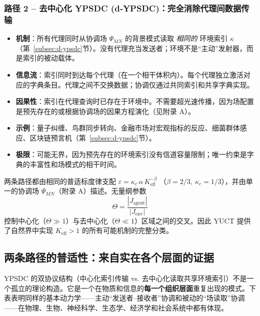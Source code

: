\documentclass[11pt,a4paper]{article}
\begin{document}
	\subsubsection*{路径 2 – 去中心化 YPSDC (d‑YPSDC)：完全消除代理间数据传输}
	\begin{itemize}[leftmargin=*]
		\item \textbf{机制}：所有代理同时从协调场 \(\Psi_{MN}\) 的背景模式读取 \emph{相同的} 环境索引 \(\kappa\)（第~\ref{subsec:d-ypsdc}节）。没有代理充当发送者；环境不是“主动”发射器，而是索引的被动载体。
		\item \textbf{信息流}：索引同时到达每个代理（在一个相干体积内）。每个代理独立激活对应的字典条目。代理之间不交换数据；协调仅通过共同索引和共享字典实现。
		\item \textbf{因果性}：索引在代理查询时已存在于环境中。不需要超光速传播，因为场配置是预先存在的或根据协调场的因果方程演化（见附录 A）。
		\item \textbf{示例}：量子纠缠、鸟群同步转向、金融市场对宏观指标的反应、细菌群体感应、区块链预言机（第~\ref{subsec:d-ypsdc}节）。
		\item \textbf{极限}：可能无界，因为预先存在的环境索引没有信道容量限制；唯一约束是字典的丰富性和场模式的相干时间。
	\end{itemize}
	
	\medskip
	\noindent
	两条路径都由相同的普适标度律支配
	\(\varepsilon = \kappa_c \, \alpha \, K_{\mathrm{eff}}^{-\beta}\)
	（\(\beta = 2/3,\ \kappa_c = 1/3\)），并由单一的协调场 \(\Psi_{MN}\)（附录 A）描述。无量纲参数
	\[
	\Theta = \frac{|J_{\mathrm{agent}}|}{|J_{\mathrm{env}}|}
	\]
	控制中心化（\(\Theta \gg 1\)）与去中心化（\(\Theta \ll 1\)）区域之间的交叉。因此 YUCT 提供了自然界中实现 \(K_{\mathrm{eff}} > 1\) 的所有可能机制的完整分类。
	
	\subsection{两条路径的普适性：来自实在各个层面的证据}
	\label{subsec:universality-two-paths}
	
	YPSDC 的双协议结构（中心化索引传输 vs. 去中心化读取共享环境索引）不是一个孤立的理论构造。它是一个在物质和信息的\textbf{每一个组织层面}重复出现的模式。下表表明同样的基本动力学——主动“发送者–接收者”协调和被动的“场读取”协调——在物理、生物、神经科学、生态学、经济学和社会系统中都有体现。
	
\end{document}
